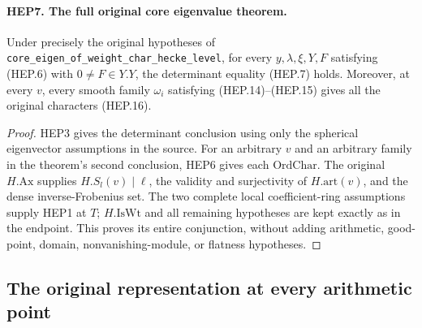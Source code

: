 \paragraph{HEP7. The full original core eigenvalue theorem.}
\label{claim:HEP7}
Under precisely the original hypotheses of
\texttt{core\_eigen\_of\_weight\_char\_hecke\_level}, for every
$y,\lambda,\xi,Y,F$ satisfying (HEP.6) with $0\ne F\in Y.Y$,
the determinant equality (HEP.7) holds.  Moreover, at every $v$,
every smooth family $\omega_i$ satisfying (HEP.14)--(HEP.15)
gives all the original characters (HEP.16).
\begin{proof}
HEP3 gives the determinant conclusion using only the spherical
eigenvector assumptions in the source.  For an arbitrary $v$ and
an arbitrary family in the theorem's second conclusion, HEP6
gives each $\mathrm{OrdChar}$.  The original
$H.\mathrm{Ax}$ supplies $H.S_l(v)\mid\ell$, the validity and
surjectivity of $H.\mathrm{art}(v)$, and the dense inverse-Frobenius
set.  The two complete local coefficient-ring assumptions supply
HEP1 at $T$; $H.\mathrm{IsWt}$ and all remaining hypotheses are
kept exactly as in the endpoint.  This proves its entire
conjunction, without adding arithmetic, good-point, domain,
nonvanishing-module, or flatness hypotheses.
\end{proof}

\subsection{The original representation at every arithmetic point}

